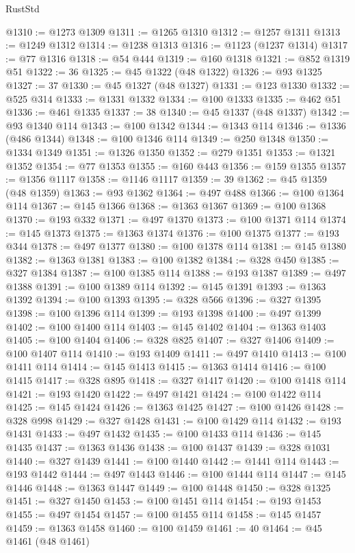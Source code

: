 \begin{lexlean}{RustStd}
\begin{coremodule}
@1310 := @1273 @1309
@1311 := @1265 @1310
@1312 := @1257 @1311
@1313 := @1249 @1312
@1314 := @1238 @1313
@1316 := @1123 (@1237 @1314)
@1317 := @77 @1316
@1318 := @54 @444
@1319 := @160 @1318
@1321 := @852 @1319 @51
@1322 := 36
@1325 := @45 @1322 (@48 @1322)
@1326 := @93 @1325
@1327 := 37
@1330 := @45 @1327 (@48 @1327)
@1331 := @123 @1330
@1332 := @525 @314
@1333 := @1331 @1332
@1334 := @100 @1333
@1335 := @462 @51
@1336 := @461 @1335
@1337 := 38
@1340 := @45 @1337 (@48 @1337)
@1342 := @93 @1340 @114
@1343 := @100 @1342
@1344 := @1343 @114
@1346 := @1336 (@486 @1344)
@1348 := @100 @1346 @114
@1349 := @250 @1348
@1350 := @1334 @1349
@1351 := @1326 @1350
@1352 := @279 @1351
@1353 := @1321 @1352
@1354 := @77 @1353
@1355 := @160 @443
@1356 := @159 @1355
@1357 := @1356 @1117
@1358 := @1146 @1117
@1359 := 39
@1362 := @45 @1359 (@48 @1359)
@1363 := @93 @1362
@1364 := @497 @488
@1366 := @100 @1364 @114
@1367 := @145 @1366
@1368 := @1363 @1367
@1369 := @100 @1368
@1370 := @193 @332
@1371 := @497 @1370
@1373 := @100 @1371 @114
@1374 := @145 @1373
@1375 := @1363 @1374
@1376 := @100 @1375
@1377 := @193 @344
@1378 := @497 @1377
@1380 := @100 @1378 @114
@1381 := @145 @1380
@1382 := @1363 @1381
@1383 := @100 @1382
@1384 := @328 @450
@1385 := @327 @1384
@1387 := @100 @1385 @114
@1388 := @193 @1387
@1389 := @497 @1388
@1391 := @100 @1389 @114
@1392 := @145 @1391
@1393 := @1363 @1392
@1394 := @100 @1393
@1395 := @328 @566
@1396 := @327 @1395
@1398 := @100 @1396 @114
@1399 := @193 @1398
@1400 := @497 @1399
@1402 := @100 @1400 @114
@1403 := @145 @1402
@1404 := @1363 @1403
@1405 := @100 @1404
@1406 := @328 @825
@1407 := @327 @1406
@1409 := @100 @1407 @114
@1410 := @193 @1409
@1411 := @497 @1410
@1413 := @100 @1411 @114
@1414 := @145 @1413
@1415 := @1363 @1414
@1416 := @100 @1415
@1417 := @328 @895
@1418 := @327 @1417
@1420 := @100 @1418 @114
@1421 := @193 @1420
@1422 := @497 @1421
@1424 := @100 @1422 @114
@1425 := @145 @1424
@1426 := @1363 @1425
@1427 := @100 @1426
@1428 := @328 @998
@1429 := @327 @1428
@1431 := @100 @1429 @114
@1432 := @193 @1431
@1433 := @497 @1432
@1435 := @100 @1433 @114
@1436 := @145 @1435
@1437 := @1363 @1436
@1438 := @100 @1437
@1439 := @328 @1031
@1440 := @327 @1439
@1441 := @100 @1440
@1442 := @1441 @114
@1443 := @193 @1442
@1444 := @497 @1443
@1446 := @100 @1444 @114
@1447 := @145 @1446
@1448 := @1363 @1447
@1449 := @100 @1448
@1450 := @328 @1325
@1451 := @327 @1450
@1453 := @100 @1451 @114
@1454 := @193 @1453
@1455 := @497 @1454
@1457 := @100 @1455 @114
@1458 := @145 @1457
@1459 := @1363 @1458
@1460 := @100 @1459
@1461 := 40
@1464 := @45 @1461 (@48 @1461)

\end{coremodule}
\end{lexlean}
